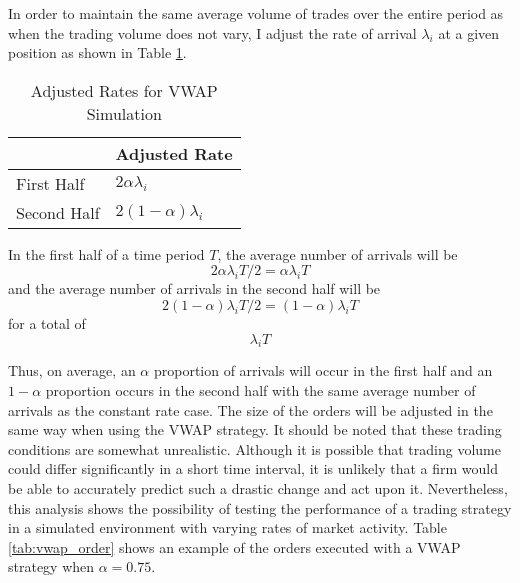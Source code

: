 In order to maintain the same average volume of trades over the entire period as when the trading volume does not vary, I adjust the rate of arrival $\lambda_i$ at a given position as shown in Table \ref{tab:adjusted_rates}.

\begin{table}[htbp]
\caption{Adjusted Rates for VWAP Simulation} \label{tab:adjusted_rates}
\begin{center}
\begin{tabular}{l|l}
            & Adjusted Rate             \\
\hline
First Half  & $2 \alpha \lambda_i $    \\
Second Half & $2 (1 - \alpha) \lambda_i$
\end{tabular}
\end{center}
\end{table}

In the first half of a time period $T$, the average number of arrivals will be 
$$2 \alpha \lambda_i T / 2 = \alpha \lambda_i T$$ 
and the average number of arrivals in the second half will be 
$$2 (1-\alpha) \lambda_i T / 2 = (1-\alpha) \lambda_i T$$
for a total of $$\lambda_i T$$

Thus, on average, an $\alpha$ proportion of arrivals will occur in the first half and an $1-\alpha$ proportion occurs in the second half with the same average number of arrivals as the constant rate case. The size of the orders will be adjusted in the same way when using the VWAP strategy. It should be noted that these trading conditions are somewhat unrealistic. Although it is possible that trading volume could differ significantly in a short time interval, it is unlikely that a firm would be able to accurately predict such a drastic change and act upon it. Nevertheless, this analysis shows the possibility of testing the performance of a trading strategy in a simulated environment with varying rates of market activity. Table \ref{tab:vwap_order} shows an example of the orders executed with a VWAP strategy when $\alpha = 0.75$.

